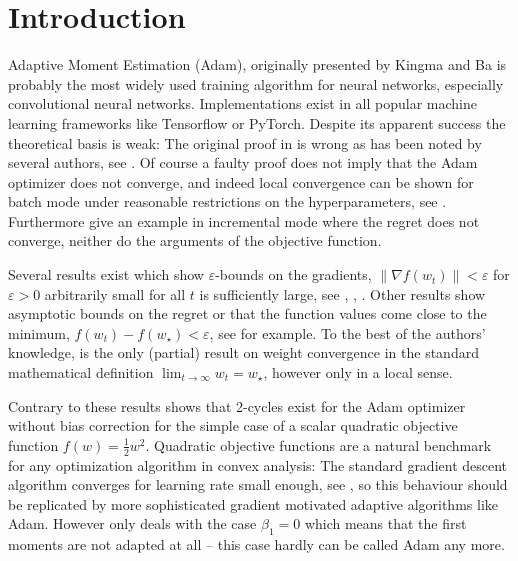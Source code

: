 \documentclass[runningheads]{llncs}
\def\weight{w}
\def\weightstar{w_\star}
\newcommand{\norm}[1]{\left\lVert#1\right\rVert}
\begin{document}
\section{Introduction}

Adaptive Moment Estimation (Adam), originally presented by Kingma and Ba 
\cite{Kingma.2014} is probably the most widely used training algorithm for neural
networks, especially convolutional neural networks. Implementations exist in all
popular machine learning frameworks like Tensorflow or PyTorch. Despite its apparent success the
theoretical basis is weak: 
The original proof in \cite{Kingma.2014} is wrong as has been noted by several authors,
see \cite{Bock.2017, Rubio.2017}. Of course a faulty proof does not imply that
the Adam optimizer does not converge, and indeed local convergence can be shown
for batch mode 
under reasonable restrictions on the hyperparameters, see \cite{BockWeiss.2019}.
Furthermore \cite{Reddi.2018} give an example in incremental mode where the
regret does not converge, neither do the arguments of the objective function.

Several results exist which show $\varepsilon$-bounds on the gradients, 
$\norm {\nabla f(\weight_t)} < \varepsilon$ for $\varepsilon>0$ arbitrarily small for all
$t$ is sufficiently large, see \cite[Theorem 3.4.]{De.2018}, \cite{Chen.2018},
\cite[Theorem 3.3]{Zhou.2018}. 
Other results show asymptotic bounds on the regret or 
that the function values come close to the minimum, $f(\weight_t)-f(\weightstar) < \varepsilon$, see \cite{Chen.2018} for example. 
To the best of the authors' knowledge, \cite{BockWeiss.2019} is the only 
(partial) result on weight convergence in the standard mathematical definition
$\lim_{t\to\infty} \weight_t =\weightstar$, however only in a local sense.

Contrary to these results \cite{daSilva.2018}  shows that 2-cycles exist for
the Adam optimizer without bias correction for the simple case of a scalar 
quadratic objective function
$f(\weight)=\frac 1 2 \weight^2$. Quadratic objective functions are a natural 
benchmark for any optimization algorithm in convex analysis: The standard gradient
descent algorithm converges for learning rate small enough, see \cite{Nesterov.2004},
so this behaviour should be replicated by more sophisticated gradient motivated 
adaptive algorithms like Adam.
However \cite[Proposition 3.3]{daSilva.2018} only deals with the case $\beta_1=0$ which means that the first moments are not adapted at all -- this case hardly can be called
Adam any more. 
\end{document}
